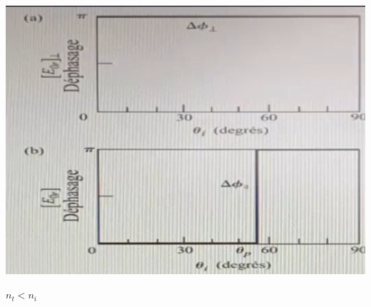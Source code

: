 \documentclass[12pt]{book}
\begin{document}
\begin{center}
\begin{minipage}{0.49\linewidth}
                        \includegraphics[width = \linewidth]{pic/graphe2.png}
                    \end{minipage}
                \end{center}
            \underline{$n_t < n_i$} 
\end{document}
